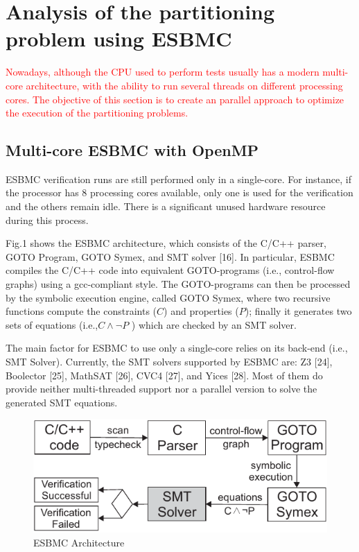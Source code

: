 \section{Analysis of the partitioning problem using ESBMC}

\textcolor{red}{Nowadays, although the CPU used to perform tests usually has a modern multi-core architecture, with the ability to run several threads on different processing cores. The objective of this section is to create an parallel approach to optimize the execution of the partitioning problems.}

\subsection{Multi-core ESBMC with OpenMP}

ESBMC verification runs are still performed only in a single-core. For instance, if the processor has 8 processing cores available, only one is used for the verification and the others remain idle. There is a significant unused hardware resource during this process.

Fig.1 shows the ESBMC architecture, which consists of the C/C++ parser, GOTO Program, GOTO Symex, and SMT solver [16]. In particular, ESBMC compiles the C/C++ code into equivalent GOTO\hyp{}programs (i.e., control-flow graphs) using a gcc-compliant style. The GOTO-programs can then be processed by the symbolic execution engine, called GOTO Symex, where two recursive functions compute the constraints ($ C $) and properties ($ P $); finally it generates two sets of equations (i.e.,\:$ C \land \neg P $ ) which are checked by an SMT solver. 

The main factor for ESBMC to use only a single-core relies on its back-end (i.e., SMT Solver). Currently, the SMT solvers supported by ESBMC are: Z3 [24], Boolector [25], MathSAT [26], CVC4 [27], and Yices [28]. Most of them do provide neither multi-threaded support nor a parallel version to solve the generated SMT equations.
\begin{figure}[ht]
	\centering
  \includegraphics[scale=0.9]{Image/esbmc-arch-new.pdf} 
	\caption{ESBMC Architecture}
\end{figure}

